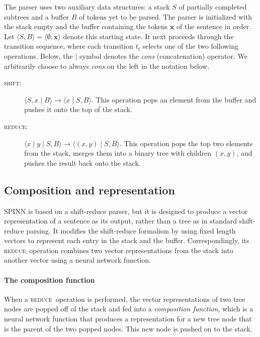 \documentclass[11pt]{article}
\newcommand{\shift}{\textsc{shift}}
\newcommand{\reduce}{\textsc{reduce}}
\begin{document}
The parser uses two auxiliary data structures: a stack $S$ of partially completed subtrees and a buffer $B$ of tokens yet to be parsed. The parser is initialized with the stack empty and the buffer containing the tokens $\mathbf x$ of the sentence in order. Let $\langle S, B \rangle = \langle \emptyset, \mathbf x \rangle$ denote this starting state. It next proceeds through the transition sequence, where each transition $t_t$ selects one of the two following operations. Below, the $\mid$ symbol denotes the \textit{cons} (concatenation) operator. We arbitrarily choose to always \textit{cons} on the left in the notation below. %
\begin{description}
  \item[\shift:] $\langle S, x \mid B \rangle \to \langle x \mid S, B \rangle$. This operation pops an element from the buffer and pushes it onto the top of the stack.
  \item[\reduce:] $\langle x \mid y \mid S, B \rangle \to \langle (x, y) \mid S, B \rangle$. This operation pops the top two elements from the stack, merges them into a binary tree with children $(x, y)$, and pushes the result back onto the stack.
\end{description}

\subsection{Composition and representation}

SPINN is based on a shift-reduce parser, but it is designed to produce a vector representation of a sentence as its output, rather than a tree as in standard shift-reduce parsing. It modifies the shift-reduce formalism by using fixed length vectors to represent each entry in the stack and the buffer. Correspondingly, its \reduce\ operation combines two vector representations from the stack into another vector using a neural network function.

\paragraph{The composition function}
When a \reduce\ operation is performed, the vector representations of two tree nodes are popped off of the stack and fed into a {\it composition function}, which is a neural network function that produces a representation for a new tree node that is the parent of the two popped nodes. This new node is pushed on to the stack.
\end{document}
